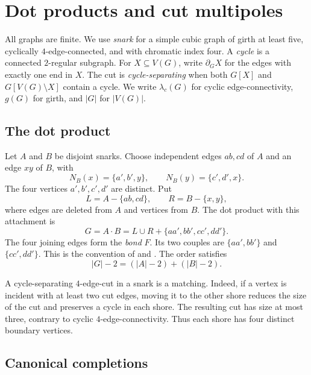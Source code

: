 \documentclass[justified,notoc,twoside,nobib,nofonts]{tufte-handout}
\begin{document}
\section{Dot products and cut multipoles}\label{sec:preliminaries}

All graphs are finite. We use \emph{snark} for a simple cubic graph of
girth at least five, cyclically $4$-edge-connected, and with chromatic
index four. A \emph{cycle} is a connected $2$-regular subgraph.
For $X\subseteq V(G)$, write $\partial_G X$ for the edges with exactly
one end in $X$. The cut is \emph{cycle-separating} when both $G[X]$ and
$G[V(G)\setminus X]$ contain a cycle. We write $\lambda_c(G)$ for
cyclic edge-connectivity, $g(G)$ for girth, and $|G|$ for $|V(G)|$.

\subsection{The dot product}

Let $A$ and $B$ be disjoint snarks. Choose independent edges $ab,cd$ of
$A$ and an edge $xy$ of $B$, with
\[
 N_B(x)=\{a',b',y\},\qquad N_B(y)=\{c',d',x\}.
\]
The four vertices $a',b',c',d'$ are distinct. Put
\[
 L=A-\{ab,cd\},\qquad R=B-\{x,y\},
\]
where edges are deleted from $A$ and vertices from $B$. The dot product
with this attachment is
\begin{equation}\label{eq:dot-product}
 G=A\mathbin{\cdot}B
   =L\cup R+\{aa',bb',cc',dd'\}.
\end{equation}
The four joining edges form the \emph{bond} $F$. Its two couples are
$\{aa',bb'\}$ and $\{cc',dd'\}$. This is the convention of
\citep[Section~2]{CS10} and \citep[Section~2]{GZ18}.
The order satisfies
\begin{equation}\label{eq:order}
 |G|-2=(|A|-2)+(|B|-2).
\end{equation}

A cycle-separating $4$-edge-cut in a snark is a matching. Indeed, if a
vertex is incident with at least two cut edges, moving it to the other
shore reduces the size of the cut and preserves a cycle in each shore.
The resulting cut has size at most three, contrary to cyclic
$4$-edge-connectivity. Thus each shore has four distinct boundary
vertices.

\subsection{Canonical completions}
\end{document}
